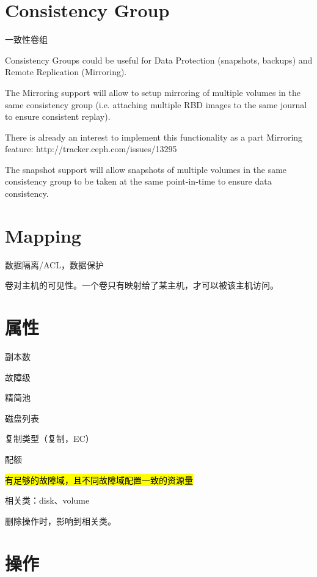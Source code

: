 \section{Consistency Group}

一致性卷组 

\begin{shadequote}
Consistency Groups could be useful for Data Protection (snapshots, backups) and
Remote Replication (Mirroring).

The Mirroring support will allow to setup mirroring of multiple volumes in the
same consistency group (i.e. attaching multiple RBD images to the same journal
to ensure consistent replay).

There is already an interest to implement this functionality as a part Mirroring feature:
http://tracker.ceph.com/issues/13295

The snapshot support will allow snapshots of multiple volumes in the same
consistency group to be taken at the same point-in-time to ensure data
consistency.
\end{shadequote}

\section{Mapping}

数据隔离/ACL，数据保护

卷对主机的可见性。一个卷只有映射给了某主机，才可以被该主机访问。

\section{属性}

\begin{enumbox}
\item 副本数
\item 故障级
\item 精简池
\item 磁盘列表
\item 复制类型（复制，EC）
\item 配额
\item \hl{有足够的故障域，且不同故障域配置一致的资源量}
\end{enumbox}

相关类：disk、volume

删除操作时，影响到相关类。

\section{操作}

